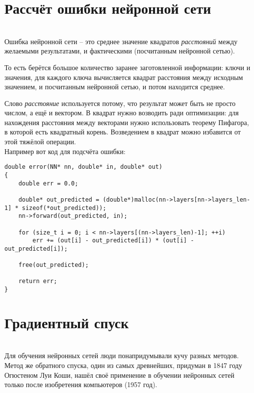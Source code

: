 \documentclass{article}
\begin{document}
    \section{Рассчёт ошибки нейронной сети}
    \ \\

        Ошибка нейронной сети -- это среднее значение квадратов
        \textit{расстояний} между желаемыми результатами, и фактическими
        (посчитанным нейронной сетью).

        То есть берётся большое количество заранее
        заготовленной информации: ключи и значения,
        для каждого ключа вычисляется квадрат расстояния между исходным значением,
        и посчитанным нейронной сетью, и потом находится среднее.

        Слово \textit{расстояние} используется потому, что результат
        может быть не просто числом, а ещё и вектором.
        В квадрат нужно возводить ради оптимизации:
        для нахождения расстояния между векторами нужно использовать
        теорему Пифагора, в которой есть квадратный корень.
        Возведением в квадрат можно избавится от этой тяжёлой операции.\\

        Например вот код для подсчёта ошибки:


        \lstset{language=C}
        \begin{lstlisting}
double error(NN* nn, double* in, double* out)
{
    double err = 0.0;
    
    double* out_predicted = (double*)malloc(nn->layers[nn->layers_len-1] * sizeof(*out_predicted));
    nn->forward(out_predicted, in);

    for (size_t i = 0; i < nn->layers[(nn->layers_len)-1]; ++i)
        err += (out[i] - out_predicted[i]) * (out[i] - out_predicted[i]);
    
    free(out_predicted);

    return err;
}
        \end{lstlisting}





    \section{Градиентный спуск}
    \ \\



        Для обучения нейронных сетей люди понапридумывали кучу разных методов. Метод же
        обратного спуска, один из самых древнейших, придуман в 1847 году Огюстеном Луи Коши,
        нашёл своё применение в обучении нейронных сетей только после изобретения компьютеров (1957 год).
\end{document}
